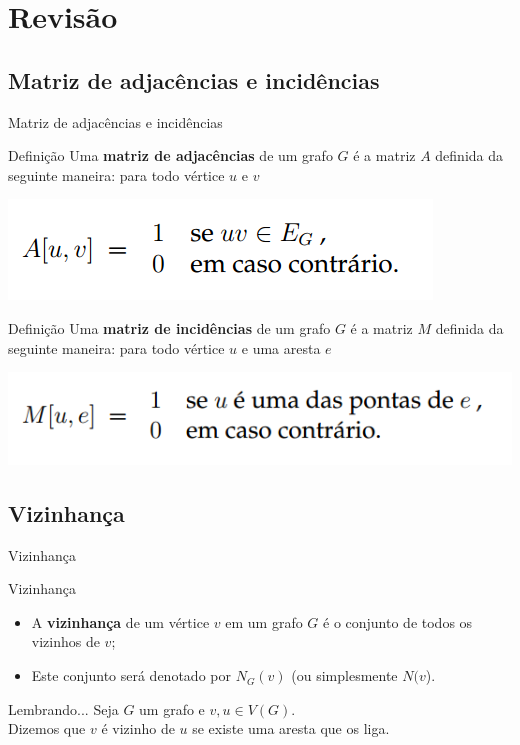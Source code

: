 \documentclass[xcolor=dvipsnames,table]{beamer}
\begin{document}
    \section{Revisão}
    \subsection{Matriz de adjacências e incidências}
	\begin{frame}{Matriz de adjacências e incidências}
		\begin{block}{Definição}
			Uma {\bf matriz de adjacências} de um grafo $G$ é a matriz $A$ definida da seguinte maneira: para todo vértice $u$ e $v$
			\begin{center}
				\includegraphics[width=.5\textwidth]{images/adjacencia.png}
			\end{center}
		\end{block}
		\begin{block}{Definição}
			Uma {\bf matriz de incidências} de um grafo $G$ é a matriz $M$ definida da seguinte maneira: para todo vértice $u$ e uma aresta $e$
			\begin{center}
				\includegraphics[width=.6\textwidth]{images/incidencia.png}
			\end{center}
		\end{block}
	\end{frame}
    
    \subsection{Vizinhança}
	\begin{frame}{Vizinhança}
		\begin{block}{Vizinhança}
			\begin{itemize}
				\item A {\bf vizinhança} de um vértice $v$ em um grafo $G$ é o conjunto de todos os vizinhos de $v$; \pause
				\item Este conjunto será denotado por $N_G(v)$ (ou simplesmente $N(v$).
			\end{itemize}
		\end{block}
		\begin{exampleblock}{Lembrando...}
			Seja $G$ um grafo e $v, u \in V(G)$. \\Dizemos que $v$ é vizinho de $u$ se existe uma aresta que os liga.
		\end{exampleblock}
	\end{frame}
	
\end{document}
